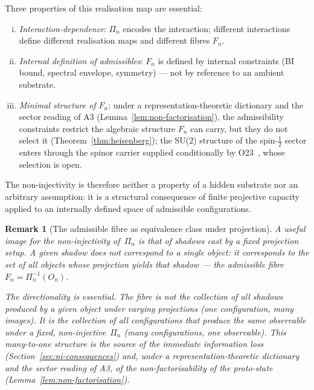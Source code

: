 \documentclass[11pt,a4paper]{article}
\newtheorem{remark}[theorem]{Remark}
\begin{document}
    Three properties of this realisation map are essential:
    \begin{enumerate}[(i)]
\item \emph{Interaction-dependence}: $\Pi_n$ encodes the interaction;
different interactions define different realisation maps and different
fibres $F_n$.
\item \emph{Internal definition of admissibles}: $F_n$ is defined by
internal constraints (BI bound, spectral envelope, symmetry) — not by
reference to an ambient substrate.
\item \emph{Minimal structure of $F_n$}: under a representation-theoretic dictionary and the sector
reading of A3 (Lemma~\ref{lem:non-factorisation}), the admissibility constraints restrict the algebraic
structure $F_n$ can carry, but they do not select it (Theorem~\ref{thm:heisenberg}); the SU(2) structure
of the spin-$\tfrac{1}{2}$ sector enters through the spinor carrier supplied conditionally by
O23~\cite{Beau2026a27}, whose selection is open.
    \end{enumerate}

    The non-injectivity is therefore neither a property of a hidden substrate
    nor an arbitrary assumption: it is a structural consequence of finite
    projective capacity applied to an internally defined space of admissible
    configurations.

    \begin{remark}[The admissible fibre as equivalence class under projection]
      \label{rem:shadow-analogy}
      A useful image for the non-injectivity of~$\Pi_n$ is that of shadows cast by a fixed
      projection setup.
      A given shadow does not correspond to a single object:
      it corresponds to the set of all objects whose projection yields that shadow ---
      the admissible fibre $F_n = \Pi_n^{-1}(O_n)$.

      The directionality is essential.
      The fibre is not the collection of all shadows produced by a given object under varying
      projections (one configuration, many images).
      It is the collection of all configurations that produce the same observable under a fixed,
      non-injective~$\Pi_n$ (many configurations, one observable).
      This many-to-one structure is the source of the immediate information loss
      (Section~\ref{sec:ni-consequences}) and, under a representation-theoretic dictionary and the sector
      reading of A3, of the non-factorisability of the proto-state (Lemma~\ref{lem:non-factorisation}).
    \end{remark}
\end{document}
